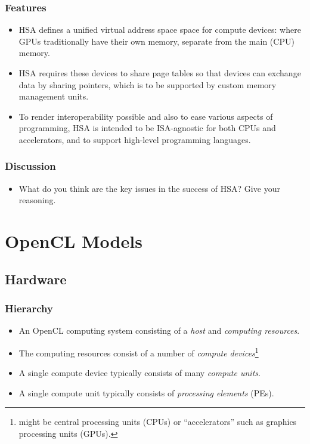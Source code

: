 \documentclass{beamer}
\begin{document}
\begin{frame}
  \frametitle{Features}
  \begin{itemize}
  \item HSA defines a unified virtual address space space for
    compute devices: where GPUs traditionally have their own memory,
    separate from the main (CPU) memory.
  \item HSA requires these devices to share page tables so that
    devices can exchange data by sharing pointers, which is to be
    supported by custom memory management units.  
  \item To render interoperability possible and also to ease
    various aspects of programming, HSA is intended to be
    ISA-agnostic for both CPUs and accelerators, and to support
    high-level programming languages.
  \end{itemize}
\end{frame}

\begin{frame}
  \frametitle{Discussion}
  \begin{itemize}
  \item What do you think are the key issues in the success of HSA?
    Give your reasoning.
  \end{itemize}
\end{frame}

\section{OpenCL Models}

\subsection{Hardware}

\begin{frame}
  \frametitle{Hierarchy}
  \begin{itemize}
  \item An OpenCL computing system consisting of a {\em host} and {\em
    computing resources}.
  \item The computing resources consist of a number of {\em compute
    devices}\footnote{might be central processing units (CPUs) or
    ``accelerators'' such as graphics processing units (GPUs).}
  \item A single compute device typically consists of many {\em compute
    units}.
  \item A single compute unit typically consists of {\em processing
    elements} (PEs).
  \end{itemize}
\end{frame}
\end{document}
